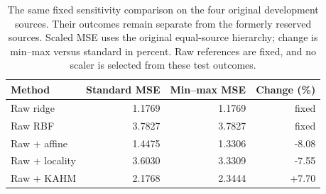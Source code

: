 \begin{table}[t]
\centering
\small
\begin{tabular}{lrrr}
\toprule
Method & Standard MSE & Min--max MSE & Change (\%) \\
\midrule
Raw ridge & 1.1769 & 1.1769 & fixed \\
Raw RBF & 3.7827 & 3.7827 & fixed \\
Raw + affine & 1.4475 & 1.3306 & -8.08 \\
Raw + locality & 3.6030 & 3.3309 & -7.55 \\
Raw + KAHM & 2.1768 & 2.3444 & +7.70 \\
\bottomrule
\end{tabular}
\caption{The same fixed sensitivity comparison on the four original development sources. Their outcomes remain separate from the formerly reserved sources. Scaled MSE uses the original equal-source hierarchy; change is min--max versus standard in percent. Raw references are fixed, and no scaler is selected from these test outcomes.}
\label{tab:scaling-development}
\end{table}
